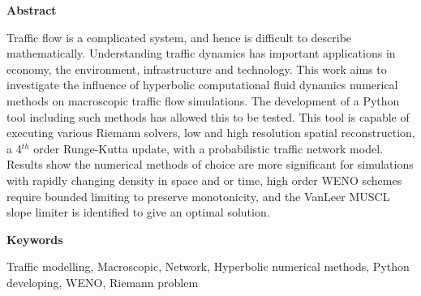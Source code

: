 \begin{centering}
\begin{minipage}[c]{0.9\textwidth}
\centering
\Huge \textbf{Abstract} \normalsize
{}

\vspace{15mm}
\justify

Traffic flow is a complicated system, and hence is difficult to describe mathematically. Understanding traffic dynamics has important applications in economy, the environment, infrastructure and technology.
This work aims to investigate the influence of hyperbolic computational fluid dynamics numerical methods on macroscopic traffic flow simulations. The development of a Python tool including such methods has allowed this to be tested.
This tool is capable of executing various Riemann solvers, low and high resolution spatial reconstruction, a 4$^{th}$ order Runge-Kutta update, with a probabilistic traffic network model.
Results show the numerical methods of choice are more significant for simulations with rapidly changing density in space and or time, high order WENO schemes require bounded limiting to preserve monotonicity, and the VanLeer MUSCL slope limiter is identified to give an optimal solution.

\end{minipage} 
\vfill
\end{centering}

\vfill





\hspace{0cm}
\begin{centering}
\begin{minipage}[c]{0.9\textwidth}

\large \textbf{Keywords} \normalsize

\vspace{5mm}

Traffic modelling, Macroscopic, Network, Hyperbolic numerical methods, Python developing, WENO, Riemann problem

\end{minipage}
\end{centering}

\pagebreak

\mbox
\pagebreak
\newpage





\mbox{} \vspace{25mm}

